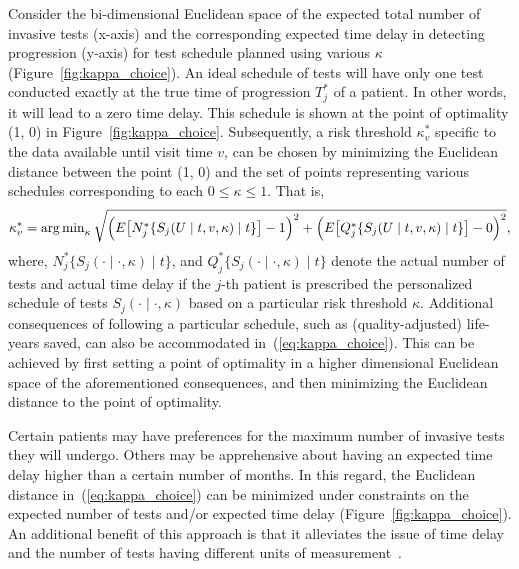 Consider the bi-dimensional Euclidean space of the expected total number of invasive tests (x-axis) and the corresponding expected time delay in detecting progression (y-axis) for test schedule planned using various $\kappa$ (Figure~\ref{fig:kappa_choice}). An ideal schedule of tests will have only one test conducted exactly at the true time of progression $T^*_j$ of a patient. In other words, it will lead to a zero time delay. This schedule is shown at the point of optimality (1, 0) in Figure~\ref{fig:kappa_choice}. Subsequently, a risk threshold $\kappa^*_v$ specific to the data available until visit time $v$, can be chosen by minimizing the Euclidean distance between the point (1, 0) and the set of points representing various schedules corresponding to each $0 \leq \kappa \leq 1$. That is,
\begin{equation}
\label{eq:kappa_choice}
\kappa^*_v = \argmin_{\kappa} \sqrt{\Big(E\big[N^*_j\{S_j(U \mid t, v, \kappa) \mid t\}\big] - 1\Big)^2 + \Big(E\big[Q^*_j\{S_j(U \mid t, v, \kappa) \mid t\}\big] - 0\Big)^2},
\end{equation}
where, $N^*_j\{S_j(\cdot \mid \cdot, \kappa) \mid t\}$, and $Q^*_j\{S_j(\cdot \mid \cdot, \kappa) \mid t\}$ denote the actual number of tests and actual time delay if the $j$-th patient is prescribed the personalized schedule of tests $S_j(\cdot \mid \cdot, \kappa)$ based on a particular risk threshold $\kappa$. Additional consequences of following a particular schedule, such as (quality-adjusted) life-years saved, can also be accommodated in~(\ref{eq:kappa_choice}). This can be achieved by first setting a point of optimality in a higher dimensional Euclidean space of the aforementioned consequences, and then minimizing the Euclidean distance to the point of optimality.

Certain patients may have preferences for the maximum number of invasive tests they will undergo. Others may be apprehensive about having an expected time delay higher than a certain number of months. In this regard, the Euclidean distance in~(\ref{eq:kappa_choice}) can be minimized under constraints on the expected number of tests and/or expected time delay (Figure~\ref{fig:kappa_choice}). An additional benefit of this approach is that it alleviates the issue of time delay and the number of tests having different units of measurement~\citep{cook1994equivalence}.

